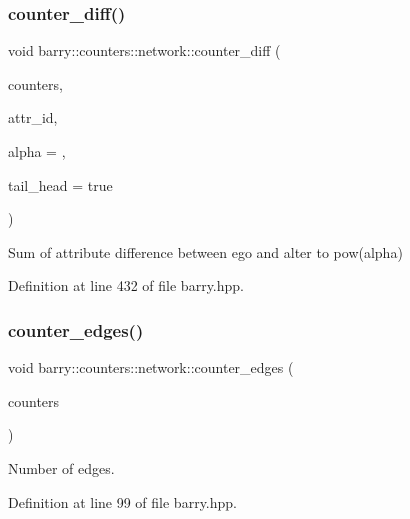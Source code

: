 \subsubsection{\texorpdfstring{counter\+\_\+diff()}{counter\_diff()}}
{\footnotesize\ttfamily void barry\+::counters\+::network\+::counter\+\_\+diff (\begin{DoxyParamCaption}\item[{\hyperlink{namespacebarry_1_1counters_1_1network_a3b3c590303d47840d1967372ae495d95}{Net\+Counter\+Vector} $\ast$}]{counters,  }\item[{\hyperlink{namespacebarry_a11dfc53ddb4672278319aa04f1e09a6c}{uint}}]{attr\+\_\+id,  }\item[{double}]{alpha = {},  }\item[{double}]{tail\+\_\+head = {\ttfamily true} }\end{DoxyParamCaption})\hspace{0.3cm}{\ttfamily [inline]}}



Sum of attribute difference between ego and alter to pow(alpha) 



Definition at line 432 of file barry.\+hpp.

\mbox{\label{namespacebarry_1_1counters_1_1network_a3c0a9e6c5697b3ec65827d405826bb33}} 
\subsubsection{\texorpdfstring{counter\+\_\+edges()}{counter\_edges()}}
{\footnotesize\ttfamily void barry\+::counters\+::network\+::counter\+\_\+edges (\begin{DoxyParamCaption}\item[{\hyperlink{namespacebarry_1_1counters_1_1network_a3b3c590303d47840d1967372ae495d95}{Net\+Counter\+Vector} $\ast$}]{counters }\end{DoxyParamCaption})\hspace{0.3cm}{\ttfamily [inline]}}



Number of edges. 



Definition at line 99 of file barry.\+hpp.

